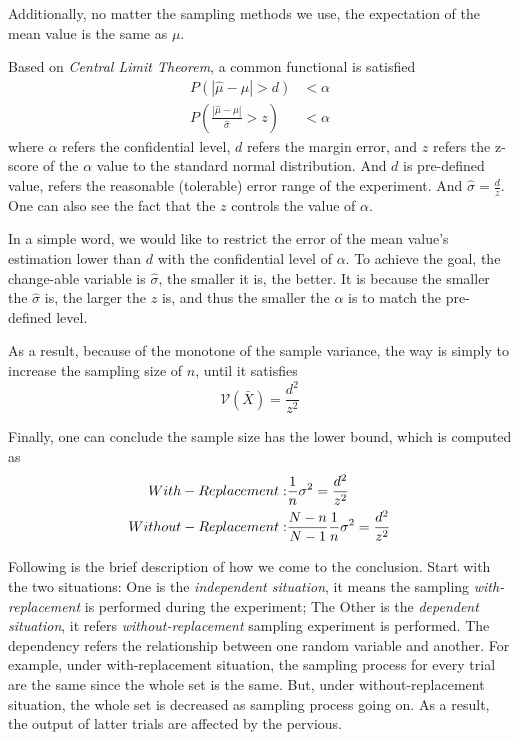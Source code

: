 Additionally,
no matter the sampling methods we use, the expectation of the mean value is the same as $\mu$.

Based on \emph{Central Limit Theorem}, a common functional is satisfied
\begin{align*}
    P(|\hat{\mu}-\mu| > d)                      & < \alpha \\
    P(\frac{|\hat{\mu}-\mu|}{\hat{\sigma}} > z) & < \alpha
\end{align*}
where $\alpha$ refers the confidential level, $d$ refers the margin error, and $z$ refers the z-score of the $\alpha$ value to the standard normal distribution.
And $d$ is pre-defined value, refers the reasonable (tolerable) error range of the experiment.
And $\hat{\sigma} = \frac{d}{z}$.
One can also see the fact that the $z$ controls the value of $\alpha$.

In a simple word, we would like to restrict the error of the mean value's estimation lower than $d$ with the confidential level of $\alpha$.
To achieve the goal, the change-able variable is $\hat{\sigma}$, the smaller it is, the better.
It is because the smaller the $\hat{\sigma}$ is, the larger the $z$ is, and thus the smaller the $\alpha$ is to match the pre-defined level.

As a result,
because of the monotone of the sample variance,
the way is simply to increase the sampling size of $n$, until it satisfies
\begin{equation*}
    \mathcal{V}(\bar{X}) = \frac{d^2}{z^2}
\end{equation*}

Finally, one can conclude the sample size has the lower bound, which is computed as
\begin{align}
    With-Replacement:    & \space \frac{1}{n} \sigma^2 = \frac{d^2}{z^2}                 \\
    Without-Replacement: & \space \frac{N-n}{N-1} \frac{1}{n} \sigma^2 = \frac{d^2}{z^2}
\end{align}

Following is the brief description of how we come to the conclusion.
Start with the two situations:
One is the \emph{independent situation}, it means the sampling \emph{with-replacement} is performed during the experiment;
The Other is the \emph{dependent situation}, it refers \emph{without-replacement} sampling experiment is performed.
The dependency refers the relationship between one random variable and another.
For example, under with-replacement situation, the sampling process for every trial are the same since the whole set is the same.
But, under without-replacement situation, the whole set is decreased as sampling process going on.
As a result, the output of latter trials are affected by the pervious.

